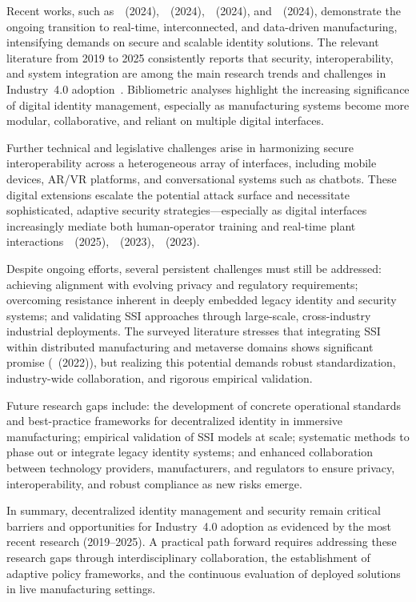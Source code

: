 \documentclass[sigconf]{acmart}
\begin{document}
Recent works, such as~\cite{ref19}~(2024),~\cite{ref20}~(2024),~\cite{ref27}~(2024), and~\cite{ref44}~(2024), demonstrate the ongoing transition to real-time, interconnected, and data-driven manufacturing, intensifying demands on secure and scalable identity solutions. The relevant literature from 2019 to 2025 consistently reports that security, interoperability, and system integration are among the main research trends and challenges in Industry~4.0 adoption~\cite{ref27,ref37,ref44}. Bibliometric analyses highlight the increasing significance of digital identity management, especially as manufacturing systems become more modular, collaborative, and reliant on multiple digital interfaces.

Further technical and legislative challenges arise in harmonizing secure interoperability across a heterogeneous array of interfaces, including mobile devices, AR/VR platforms, and conversational systems such as chatbots. These digital extensions escalate the potential attack surface and necessitate sophisticated, adaptive security strategies—especially as digital interfaces increasingly mediate both human-operator training and real-time plant interactions~\cite{ref37}~(2025),~\cite{ref42}~(2023),~\cite{ref57}~(2023).

Despite ongoing efforts, several persistent challenges must still be addressed: achieving alignment with evolving privacy and regulatory requirements; overcoming resistance inherent in deeply embedded legacy identity and security systems; and validating SSI approaches through large-scale, cross-industry industrial deployments. The surveyed literature stresses that integrating SSI within distributed manufacturing and metaverse domains shows significant promise (\cite{ref92}~(2022)), but realizing this potential demands robust standardization, industry-wide collaboration, and rigorous empirical validation.

Future research gaps include: the development of concrete operational standards and best-practice frameworks for decentralized identity in immersive manufacturing; empirical validation of SSI models at scale; systematic methods to phase out or integrate legacy identity systems; and enhanced collaboration between technology providers, manufacturers, and regulators to ensure privacy, interoperability, and robust compliance as new risks emerge. 

In summary, decentralized identity management and security remain critical barriers and opportunities for Industry~4.0 adoption as evidenced by the most recent research (2019–2025). A practical path forward requires addressing these research gaps through interdisciplinary collaboration, the establishment of adaptive policy frameworks, and the continuous evaluation of deployed solutions in live manufacturing settings.
\end{document}
